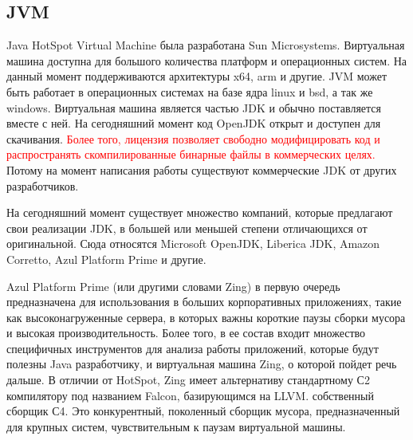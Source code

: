 \subsection{JVM}
Java HotSpot Virtual Machine была разработана Sun Microsystems. Виртуальная машина доступна для большого количества платформ и операционных систем. На данный момент поддерживаются архитектуры x64, arm и другие. JVM может быть работает в операционных системах на базе ядра linux и bsd, а так же windows. Виртуальная машина является частью JDK и обычно поставляется вместе с ней. На сегодняшний момент код OpenJDK открыт и доступен для скачивания. \textcolor{red}{Более того, лицензия позволяет свободно модифицировать код и распространять скомпилированные бинарные файлы в коммерческих целях.} Потому на момент написания работы существуют коммерческие JDK от других разработчиков.
\par
На сегодняшний момент существует множество компаний, которые предлагают свои реализации JDK, в большей или меньшей степени отличающихся от оригинальной. Сюда относятся Microsoft OpenJDK, Liberica JDK, Amazon Corretto, Azul Platform Prime и другие.
\par
Azul Platform Prime (или другими словами Zing) в первую очередь предназначена для использования в больших корпоративных приложениях, такие как высоконагруженные сервера, в которых важны короткие паузы сборки мусора и высокая производительность. 
Более того, в ее состав входит множество специфичных инструментов для анализа работы приложений, которые будут полезны Java разработчику, и виртуальная машина Zing, о которой пойдет речь дальше. В отличии от HotSpot, Zing имеет альтернативу стандартному С2 компилятору под названием Falcon, базирующимся на LLVM. собственный сборщик С4. Это конкурентный, поколенный сборщик мусора\cite{C4-perf}, предназначенный для крупных систем, чувствительным к паузам виртуальной машины.


